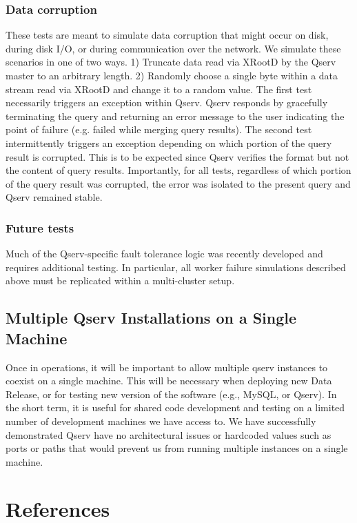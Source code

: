 \documentclass[DM,lsstdraft,toc]{lsstdoc}
\begin{document}
\subsubsection{Data corruption}\label{data-corruption}

These tests are meant to simulate data corruption that might occur on
disk, during disk I/O, or during communication over the network. We
simulate these scenarios in one of two ways. 1) Truncate data read via
XRootD by the Qserv master to an arbitrary
length. 2) Randomly choose a single byte within a data stream read via
XRootD and change it to a random value. The
first test necessarily triggers an exception within Qserv. Qserv
responds by gracefully terminating the query and returning an error
message to the user indicating the point of failure (e.g. failed while
merging query results). The second test intermittently triggers an
exception depending on which portion of the query result is corrupted.
This is to be expected since Qserv verifies the format but not the
content of query results. Importantly, for all tests, regardless of
which portion of the query result was corrupted, the error was isolated
to the present query and Qserv remained stable.

\subsubsection{Future tests}\label{future-tests}

Much of the Qserv-specific fault tolerance logic was recently developed
and requires additional testing. In particular, all worker failure
simulations described above must be replicated within a multi-cluster
setup.

\subsection{Multiple Qserv Installations on a Single
Machine}\label{multiple-qserv-installations-on-a-single-machine}

Once in operations, it will be important to allow multiple qserv
instances to coexist on a single machine. This will be necessary when
deploying new Data Release, or for testing new version of the software
(e.g., MySQL, or Qserv). In the short term, it is useful for shared code
development and testing on a limited number of development machines we
have access to. We have successfully demonstrated Qserv have no
architectural issues or hardcoded values such as ports or paths that
would prevent us from running multiple instances on a single machine.

\section{References}\label{references}
\renewcommand{\refname}{}

\end{document}
